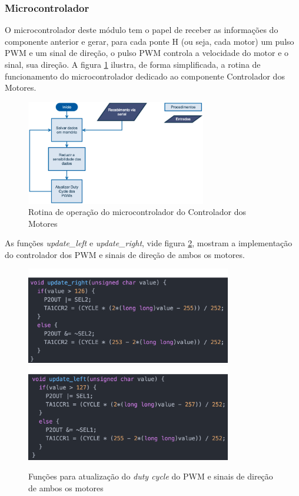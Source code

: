		\subsubsection{Microcontrolador}

			O microcontrolador deste módulo tem o papel de receber as informações do componente anterior e gerar, para cada ponte H (ou seja, cada motor) um pulso PWM e um sinal de direção, o pulso PWM controla a velocidade do motor e o sinal, sua direção. A figura \ref{fig:motor_routine} ilustra, de forma simplificada, a rotina de funcionamento do microcontrolador dedicado ao componente Controlador dos Motores.

			\begin{figure}[!htb]
				\centering
				\includegraphics[width = 0.7\textwidth]{figuras/resultados/motor_routine}
				\caption{Rotina de operação do microcontrolador do Controlador dos Motores}
				\label{fig:motor_routine}
			\end{figure}

			As funções \textit{update\_left} e \textit{update\_right}, vide figura \ref{fig:update_motors}, mostram a implementação do controlador dos PWM e sinais de direção de ambos os motores.

			\begin{figure}[!htb]
				\centering
				\includegraphics[width = 0.8\textwidth]{figuras/resultados/update_motor_right}
				\includegraphics[width = 0.8\textwidth]{figuras/resultados/update_motor_left}
				\caption{Funções para atualização do \textit{duty cycle} do PWM e sinais de direção de ambos os motores}
				\label{fig:update_motors}
			\end{figure}


